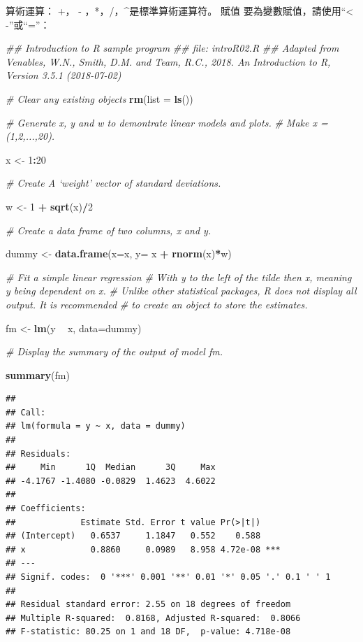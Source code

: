 \documentclass[]{book}
\newenvironment{Shaded}{\begin{snugshade}}{\end{snugshade}}
\newcommand{\CommentTok}[1]{\textcolor[rgb]{0.56,0.35,0.01}{\textit{#1}}}
\newcommand{\DataTypeTok}[1]{\textcolor[rgb]{0.13,0.29,0.53}{#1}}
\newcommand{\DecValTok}[1]{\textcolor[rgb]{0.00,0.00,0.81}{#1}}
\newcommand{\KeywordTok}[1]{\textcolor[rgb]{0.13,0.29,0.53}{\textbf{#1}}}
\newcommand{\NormalTok}[1]{#1}
\newcommand{\OperatorTok}[1]{\textcolor[rgb]{0.81,0.36,0.00}{\textbf{#1}}}
\newcommand{\StringTok}[1]{\textcolor[rgb]{0.31,0.60,0.02}{#1}}
\begin{document}
算術運算：
+， - ，*，/，\^{}是標準算術運算符。
賦值
要為變數賦值，請使用``\textless{} -''或``=''：

\begin{Shaded}
\begin{Highlighting}[]
\CommentTok{## Introduction to R sample program }
\CommentTok{## file: introR02.R}
\CommentTok{## Adapted from Venables, W.N., Smith, D.M. and Team, R.C., 2018. An Introduction to R, Version 3.5.1 (2018-07-02)}


\CommentTok{# Clear any existing objects }
\KeywordTok{rm}\NormalTok{(}\DataTypeTok{list =} \KeywordTok{ls}\NormalTok{())}

\CommentTok{# Generate x, y and w to demontrate linear models and plots.}
\CommentTok{# Make x = (1,2,...,20).}

\NormalTok{x <-}\StringTok{ }\DecValTok{1}\OperatorTok{:}\DecValTok{20}

\CommentTok{# Create A ‘weight’ vector of standard deviations.}

\NormalTok{w <-}\StringTok{ }\DecValTok{1} \OperatorTok{+}\StringTok{ }\KeywordTok{sqrt}\NormalTok{(x)}\OperatorTok{/}\DecValTok{2}

\CommentTok{# Create a data frame of two columns, x and y.}

\NormalTok{dummy <-}\StringTok{ }\KeywordTok{data.frame}\NormalTok{(}\DataTypeTok{x=}\NormalTok{x, }\DataTypeTok{y=}\NormalTok{ x }\OperatorTok{+}\StringTok{ }\KeywordTok{rnorm}\NormalTok{(x)}\OperatorTok{*}\NormalTok{w)}

\CommentTok{# Fit a simple linear regression }
\CommentTok{# With y to the left of the tilde then x, meaning y being dependent on x.}
\CommentTok{# Unlike other statistical packages, R does not display all output.  It is recommended}
\CommentTok{# to create an object to store the estimates.}

\NormalTok{fm <-}\StringTok{ }\KeywordTok{lm}\NormalTok{(y }\OperatorTok{~}\StringTok{ }\NormalTok{x, }\DataTypeTok{data=}\NormalTok{dummy) }

\CommentTok{# Display the summary of the output of model fm.}

\KeywordTok{summary}\NormalTok{(fm)}
\end{Highlighting}
\end{Shaded}

\begin{verbatim}
## 
## Call:
## lm(formula = y ~ x, data = dummy)
## 
## Residuals:
##     Min      1Q  Median      3Q     Max 
## -4.1767 -1.4080 -0.0829  1.4623  4.6022 
## 
## Coefficients:
##             Estimate Std. Error t value Pr(>|t|)    
## (Intercept)   0.6537     1.1847   0.552    0.588    
## x             0.8860     0.0989   8.958 4.72e-08 ***
## ---
## Signif. codes:  0 '***' 0.001 '**' 0.01 '*' 0.05 '.' 0.1 ' ' 1
## 
## Residual standard error: 2.55 on 18 degrees of freedom
## Multiple R-squared:  0.8168, Adjusted R-squared:  0.8066 
## F-statistic: 80.25 on 1 and 18 DF,  p-value: 4.718e-08
\end{verbatim}
\end{document}
